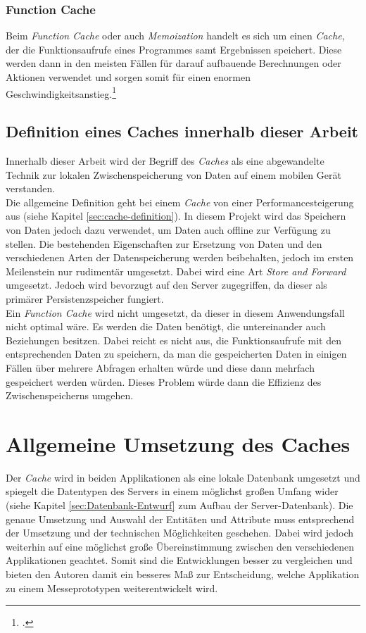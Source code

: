 \subsubsection*{Function Cache}
\label{sssec:cache-function-cache}
Beim \textit{Function Cache} oder auch \textit{Memoization} handelt es sich um einen \textit{Cache}, der die Funktionsaufrufe eines Programmes samt Ergebnissen speichert. Diese werden dann in den meisten Fällen für darauf aufbauende Berechnungen oder Aktionen verwendet und sorgen somit für einen enormen Geschwindigkeitsanstieg.\footcite{Cache-Memoization}
\subsection{Definition eines Caches innerhalb dieser Arbeit}
\label{ssec:cache-unsere-definition}
Innerhalb dieser Arbeit wird der Begriff des \textit{Caches} als eine abgewandelte Technik zur lokalen Zwischenspeicherung von Daten auf einem mobilen Gerät verstanden. \\
Die allgemeine Definition geht bei einem \textit{Cache} von einer Performancesteigerung aus (siehe Kapitel \ref{sec:cache-definition}). In diesem Projekt wird das Speichern von Daten jedoch dazu verwendet, um Daten auch offline zur Verfügung zu stellen. Die bestehenden Eigenschaften zur Ersetzung von Daten und den verschiedenen Arten der Datenspeicherung werden beibehalten, jedoch im ersten Meilenstein nur rudimentär umgesetzt. Dabei wird eine Art \textit{Store and Forward} umgesetzt. Jedoch wird bevorzugt auf den Server zugegriffen, da dieser als primärer Persistenzspeicher fungiert. \\
Ein \textit{Function Cache} wird nicht umgesetzt, da dieser in diesem Anwendungsfall nicht optimal wäre. Es werden die Daten benötigt, die untereinander auch Beziehungen besitzen. Dabei reicht es nicht aus, die Funktionsaufrufe mit den entsprechenden Daten zu speichern, da man die gespeicherten Daten in einigen Fällen über mehrere Abfragen erhalten würde und diese dann mehrfach gespeichert werden würden. Dieses Problem würde dann die Effizienz des Zwischenspeicherns umgehen.
\section{Allgemeine Umsetzung des Caches}
\label{sec:cache-umsetzung}
Der \textit{Cache} wird in beiden Applikationen als eine lokale Datenbank umgesetzt und spiegelt die Datentypen des Servers in einem möglichst großen Umfang wider (siehe Kapitel \ref{sec:Datenbank-Entwurf} zum Aufbau der Server-Datenbank). Die genaue Umsetzung und Auswahl der Entitäten und Attribute muss entsprechend der Umsetzung und der technischen Möglichkeiten geschehen. Dabei wird jedoch weiterhin auf eine möglichst große Übereinstimmung zwischen den verschiedenen Applikationen geachtet. Somit sind die Entwicklungen besser zu vergleichen und bieten den Autoren damit ein besseres Maß zur Entscheidung, welche Applikation zu einem Messeprototypen weiterentwickelt wird.
